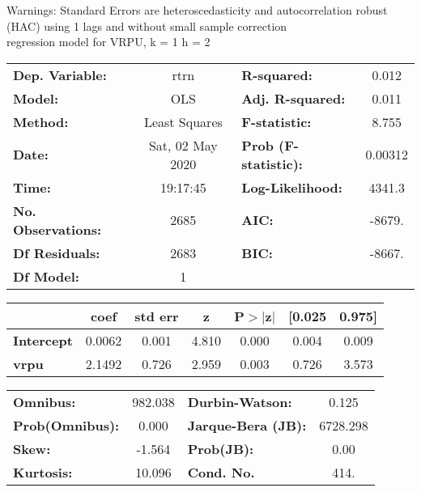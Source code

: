 Warnings: \newline
 [1] Standard Errors are heteroscedasticity and autocorrelation robust (HAC) using 1 lags and without small sample correction\\ 

regression model for VRPU, k = 1 h = 2\begin{center}
\begin{tabular}{lclc}
\toprule
\textbf{Dep. Variable:}    &       rtrn       & \textbf{  R-squared:         } &     0.012   \\
\textbf{Model:}            &       OLS        & \textbf{  Adj. R-squared:    } &     0.011   \\
\textbf{Method:}           &  Least Squares   & \textbf{  F-statistic:       } &     8.755   \\
\textbf{Date:}             & Sat, 02 May 2020 & \textbf{  Prob (F-statistic):} &  0.00312    \\
\textbf{Time:}             &     19:17:45     & \textbf{  Log-Likelihood:    } &    4341.3   \\
\textbf{No. Observations:} &        2685      & \textbf{  AIC:               } &    -8679.   \\
\textbf{Df Residuals:}     &        2683      & \textbf{  BIC:               } &    -8667.   \\
\textbf{Df Model:}         &           1      & \textbf{                     } &             \\
\bottomrule
\end{tabular}
\begin{tabular}{lcccccc}
                   & \textbf{coef} & \textbf{std err} & \textbf{z} & \textbf{P$> |$z$|$} & \textbf{[0.025} & \textbf{0.975]}  \\
\midrule
\textbf{Intercept} &       0.0062  &        0.001     &     4.810  &         0.000        &        0.004    &        0.009     \\
\textbf{vrpu}      &       2.1492  &        0.726     &     2.959  &         0.003        &        0.726    &        3.573     \\
\bottomrule
\end{tabular}
\begin{tabular}{lclc}
\textbf{Omnibus:}       & 982.038 & \textbf{  Durbin-Watson:     } &    0.125  \\
\textbf{Prob(Omnibus):} &   0.000 & \textbf{  Jarque-Bera (JB):  } & 6728.298  \\
\textbf{Skew:}          &  -1.564 & \textbf{  Prob(JB):          } &     0.00  \\
\textbf{Kurtosis:}      &  10.096 & \textbf{  Cond. No.          } &     414.  \\
\bottomrule
\end{tabular}
\end{center}

